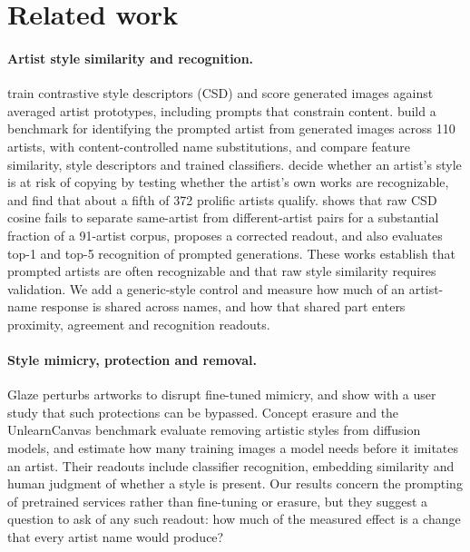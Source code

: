 \documentclass[10pt]{article}
\begin{document}
\section{Related work}\label{sec:related}

\paragraph{Artist style similarity and recognition.}
\citet{somepalli2024style} train contrastive style descriptors (CSD) and score
generated images against averaged artist prototypes, including prompts that
constrain content. \citet{su2025prompted} build a benchmark for identifying the
prompted artist from generated images across 110 artists, with content-controlled
name substitutions, and compare feature similarity, style descriptors and trained
classifiers. \citet{moayeri2025rethinking} decide whether an artist's style is at
risk of copying by testing whether the artist's own works are recognizable, and
find that about a fifth of 372 prolific artists qualify. \citet{frochte2026csd}
shows that raw CSD cosine fails to separate same-artist from different-artist pairs
for a substantial fraction of a 91-artist corpus, proposes a corrected readout, and
also evaluates top-1 and top-5 recognition of prompted generations. These works
establish that prompted artists are often recognizable and that raw style
similarity requires validation. We add a generic-style control and measure how much
of an artist-name response is shared across names, and how that shared part enters
proximity, agreement and recognition readouts.

\paragraph{Style mimicry, protection and removal.}
Glaze \citep{shan2023glaze} perturbs artworks to disrupt fine-tuned mimicry, and
\citet{honig2025adversarial} show with a user study that such protections can be
bypassed. Concept erasure \citep{gandikota2023erasing} and the UnlearnCanvas
benchmark \citep{zhang2024unlearncanvas} evaluate removing artistic styles from
diffusion models, and \citet{verma2025imitation} estimate how many training images
a model needs before it imitates an artist. Their readouts include classifier
recognition, embedding similarity and human judgment of whether a style is
present. Our results concern the prompting of pretrained services rather than
fine-tuning or erasure, but they suggest a question to ask of any such readout:
how much of the measured effect is a change that every artist name would produce?
\end{document}
